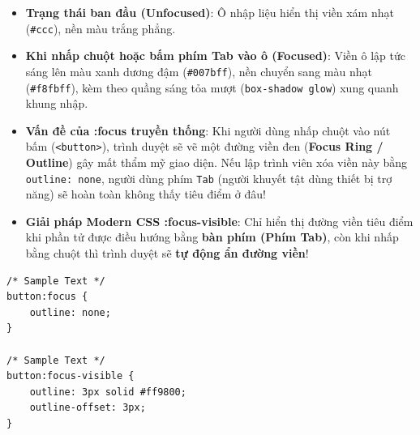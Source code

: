\documentclass[11pt,oneside]{book}
\newcommand{\codeinline}[1]{\textcolor{accentOrange}{\texttt{#1}}}
\newcommand{\term}[1]{\textbf{\textcolor{primaryBlue}{#1}}}
\begin{document}
\begin{browserWindow}
\begin{itemize}[leftmargin=1.5em, itemsep=3pt, parsep=0pt]
    \item \textbf{Trạng thái ban đầu (Unfocused)}: Ô nhập liệu hiển thị viền xám nhạt (\codeinline{\#ccc}), nền màu trắng phẳng.
    \item \textbf{Khi nhấp chuột hoặc bấm phím Tab vào ô (Focused)}: Viền ô lập tức sáng lên màu xanh dương đậm (\codeinline{\#007bff}), nền chuyển sang màu nhạt (\codeinline{\#f8fbff}), kèm theo quầng sáng tỏa mượt (\codeinline{box-shadow glow}) xung quanh khung nhập.
\end{itemize}
\end{browserWindow}

\begin{conceptBox}
\begin{itemize}[leftmargin=1.5em, itemsep=3pt, parsep=0pt]
    \item \textbf{Vấn đề của :focus truyền thống}: Khi người dùng nhấp chuột vào nút bấm (\codeinline{<button>}), trình duyệt sẽ vẽ một đường viền đen (\term{Focus Ring / Outline}) gây mất thẩm mỹ giao diện. Nếu lập trình viên xóa viền này bằng \codeinline{outline: none}, người dùng phím \codeinline{Tab} (người khuyết tật dùng thiết bị trợ năng) sẽ hoàn toàn không thấy tiêu điểm ở đâu!
    \item \textbf{Giải pháp Modern CSS :focus-visible}: Chỉ hiển thị đường viền tiêu điểm khi phần tử được điều hướng bằng \textbf{bàn phím (Phím Tab)}, còn khi nhấp bằng chuột thì trình duyệt sẽ \textbf{tự động ẩn đường viền}!
\end{itemize}

\begin{codeWindow}
\begin{lstlisting}[language=CSS3]
/* Sample Text */
button:focus {
    outline: none;
}

/* Sample Text */
button:focus-visible {
    outline: 3px solid #ff9800;
    outline-offset: 3px;
}
\end{lstlisting}
\end{codeWindow}
\end{conceptBox}
\end{document}
